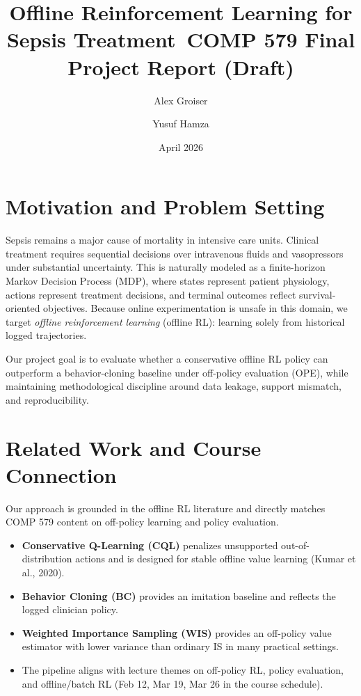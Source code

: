 \documentclass[10pt]{article}
\title{Offline Reinforcement Learning for Sepsis Treatment\
\large COMP 579 Final Project Report (Draft)}
\author{Alex Groiser \and Yusuf Hamza}
\date{April 2026}
\begin{document}
\maketitle
\vspace{-0.6cm}

\section{Motivation and Problem Setting}
Sepsis remains a major cause of mortality in intensive care units. Clinical treatment requires sequential decisions over intravenous fluids and vasopressors under substantial uncertainty. This is naturally modeled as a finite-horizon Markov Decision Process (MDP), where states represent patient physiology, actions represent treatment decisions, and terminal outcomes reflect survival-oriented objectives. Because online experimentation is unsafe in this domain, we target \emph{offline reinforcement learning} (offline RL): learning solely from historical logged trajectories.

Our project goal is to evaluate whether a conservative offline RL policy can outperform a behavior-cloning baseline under off-policy evaluation (OPE), while maintaining methodological discipline around data leakage, support mismatch, and reproducibility.

\section{Related Work and Course Connection}
Our approach is grounded in the offline RL literature and directly matches COMP 579 content on off-policy learning and policy evaluation.
\begin{itemize}[leftmargin=*]
  \item \textbf{Conservative Q-Learning (CQL)} penalizes unsupported out-of-distribution actions and is designed for stable offline value learning (Kumar et al., 2020).
  \item \textbf{Behavior Cloning (BC)} provides an imitation baseline and reflects the logged clinician policy.
  \item \textbf{Weighted Importance Sampling (WIS)} provides an off-policy value estimator with lower variance than ordinary IS in many practical settings.
  \item The pipeline aligns with lecture themes on off-policy RL, policy evaluation, and offline/batch RL (Feb 12, Mar 19, Mar 26 in the course schedule).
\end{itemize}
\end{document}
